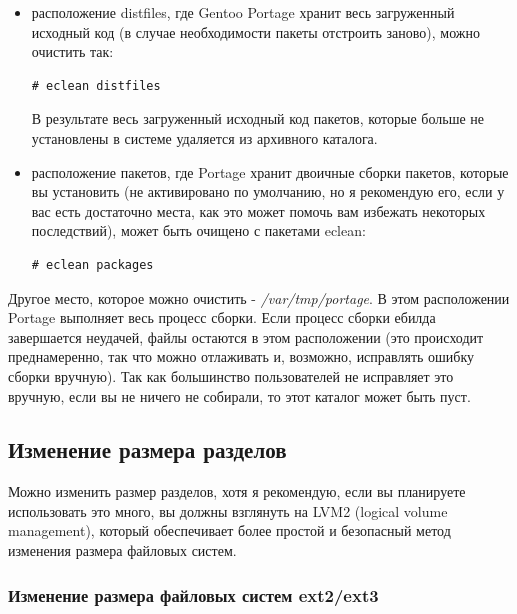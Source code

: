 \documentclass[10pt]{book}
\begin{document}
\begin{itemize}

\item расположение distfiles, где Gentoo Portage хранит весь загруженный исходный код (в случае необходимости пакеты отстроить заново), можно очистить так:

\begin{tcolorbox} 
\begin{lstlisting}
# eclean distfiles
\end{lstlisting}
\end{tcolorbox}

В результате весь загруженный исходный код пакетов, которые больше не установлены в системе удаляется из архивного каталога.

\item расположение пакетов, где Portage хранит двоичные сборки пакетов, которые вы установить (не активировано по умолчанию, но я рекомендую его, если у вас есть достаточно места, как это может помочь вам избежать некоторых последствий), может быть очищено с пакетами eclean:

\begin{tcolorbox} 
\begin{lstlisting}
# eclean packages
\end{lstlisting}
\end{tcolorbox}
\end{itemize}

Другое место, которое можно очистить - \textit{/var/tmp/portage}. В этом расположении Portage выполняет весь процесс сборки. Если процесс сборки ебилда завершается неудачей, файлы остаются в этом расположении (это происходит преднамеренно, так что можно отлаживать и, возможно, исправлять ошибку сборки вручную). Так как большинство пользователей не исправляет это вручную, если вы не ничего не собирали, то этот каталог может быть пуст.

\subsection{Изменение размера разделов}

Можно изменить размер разделов, хотя я рекомендую, если вы планируете использовать это много, вы должны взглянуть на LVM2 (logical volume management), который обеспечивает более простой и безопасный метод изменения размера файловых систем.

\subsubsection{Изменение размера файловых систем ext2/ext3}
\end{document}
